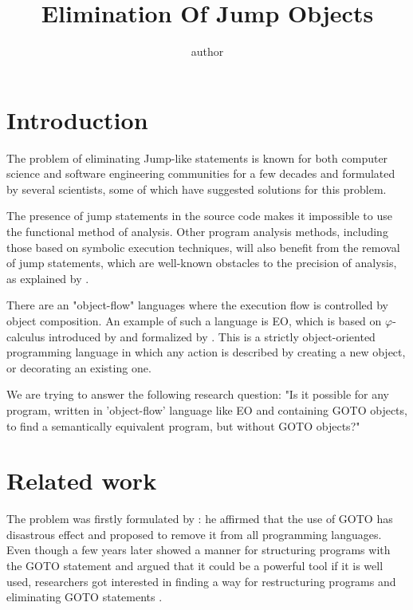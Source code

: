 \documentclass[sigplan,review,11pt,nonacm,natbib=false]{acmart}
\title{Elimination Of Jump Objects}
\author{author}
\theoremstyle{theorems}
\begin{document}
    \maketitle

    \section{Introduction}
    The problem of eliminating Jump-like statements is known for both computer science and software engineering communities for a few decades and formulated by several scientists, some of which have suggested solutions for this problem.

    The presence of jump statements in the source code makes it impossible to use the functional method of analysis.
    Other program analysis methods, including those based on symbolic execution techniques, will also benefit from the removal of jump statements, which are well-known obstacles to the precision of analysis, as explained by \citet{baldoni2018survey}.

    There are an "object-flow" languages where the execution flow is controlled by object composition.
    An example of such a language is EO, which is based on $\varphi$-calculus introduced by \citet{bugayenko2021eolang} and formalized by \citet{kudasov2021}.
    This is a strictly object-oriented programming language in which any action is described by creating a new object, or decorating an existing one.

    We are trying to answer the following research question: "Is it possible for any program, written in 'object-flow' language like EO and containing GOTO objects, to find a semantically equivalent program, but without GOTO objects?"

    \section{Related work}
    The problem was firstly formulated by \citet{dijkstra1968letters}: he affirmed that the use of GOTO has disastrous effect and proposed to remove it from all programming languages.
    Even though a few years later \citet{knuth1974structured} showed a manner for structuring programs with the GOTO statement and argued that it could be a powerful tool if it is well used, researchers got interested in finding a way for restructuring programs and eliminating GOTO statements \citep{arsac1977construction}.
\end{document}
